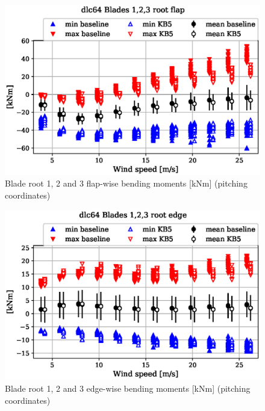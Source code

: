 \begin{figure}[!ht]
\begin{center}
	\includegraphics[width=.85\linewidth]{figures/baseline-vs-KB6/dlc64/blade1-blade1-node-001-momentvec-x_AA0008_AA0008.eps}
\end{center}
\caption{Blade root 1, 2 and 3 flap-wise bending moments [kNm] (pitching coordinates)}
\label{fig:baseline-vs-KB6:dlc64:blade-root-flap}
\end{figure}

\begin{figure}[!ht]
\begin{center}
	\includegraphics[width=.85\linewidth]{figures/baseline-vs-KB6/dlc64/blade1-blade1-node-001-momentvec-y_AA0008_AA0008.eps}
\end{center}
\caption{Blade root 1, 2 and 3 edge-wise bending moments [kNm] (pitching coordinates)}
\label{fig:baseline-vs-KB6:dlc64:blade-root-edge}
\end{figure}


